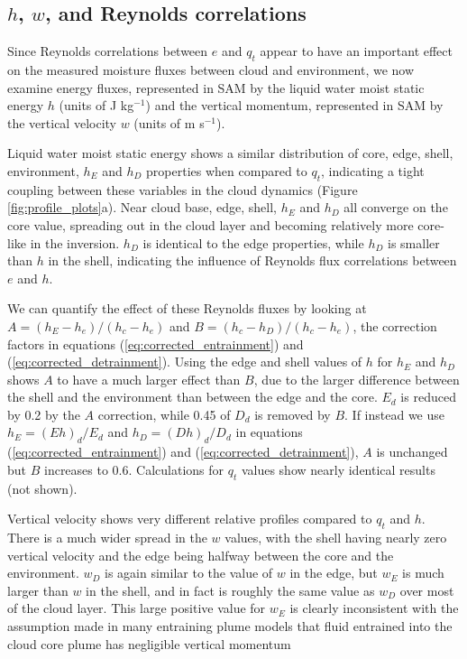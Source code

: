 \documentclass[12pt]{article}
\begin{document}
\subsection{$h$, $w$, and Reynolds correlations}

Since Reynolds correlations between $e$ and $q_t$ appear to have an important 
effect on the measured moisture fluxes between cloud and environment, we now 
examine energy fluxes, represented in SAM by the liquid water moist static 
energy $h$ (units of J kg$^{-1}$) and the vertical momentum, represented in SAM 
by the vertical velocity $w$ (units of m s$^{-1}$).

Liquid water moist static energy shows a similar distribution of core, edge, 
shell, environment, $h_E$ and $h_D$ properties when compared to $q_t$, 
indicating a tight coupling between these variables in the cloud dynamics 
(Figure \ref{fig:profile_plots}a).  Near cloud base, edge, shell, $h_E$ and 
$h_D$ all converge on the core value, spreading out in the cloud layer and 
becoming relatively more core-like in the inversion.  $h_D$ is identical to the 
edge properties, while $h_D$ is smaller than $h$ in the shell, indicating the 
influence of Reynolds flux correlations between $e$ and $h$.

We can quantify the effect of these Reynolds fluxes by looking at 
$A = (h_E - h_e)/(h_c - h_e)$ and $B = (h_c - h_D)/(h_c - h_e)$, the correction 
factors in equations (\ref{eq:corrected_entrainment}) and 
(\ref{eq:corrected_detrainment}).  Using the edge and shell values of $h$ for 
$h_E$ and $h_D$ shows $A$ to have a much larger effect than $B$, due to the 
larger difference between the shell and the environment than between the edge 
and the core.  $E_d$ is reduced by 0.2 by the $A$ correction, while 0.45 of
$D_d$ is removed by $B$.  If instead we use $h_E = (E h)_d/E_d$ and 
$h_D = (D h)_d/D_d$ in equations (\ref{eq:corrected_entrainment}) and 
(\ref{eq:corrected_detrainment}), $A$ is unchanged but $B$ increases to 0.6.  
Calculations for $q_t$ values show nearly identical results (not shown).

Vertical velocity shows very different relative profiles compared to
$q_t$ and $h$.  There is a much wider spread in the $w$ values,
with the shell having nearly zero vertical velocity and the edge being
halfway between the core and the environment.  $w_D$ is again similar
to the value of $w$ in the edge, but $w_E$ is much larger than $w$ in
the shell, and in fact is roughly the same value as $w_D$ over most of
the cloud layer.  This large positive value for $w_E$ is clearly inconsistent
with the assumption made in many entraining plume models that 
fluid entrained into the cloud core plume has negligible vertical momentum
\citep{Simpson1969,Gregory2001,Siebesma2003}
\end{document}
